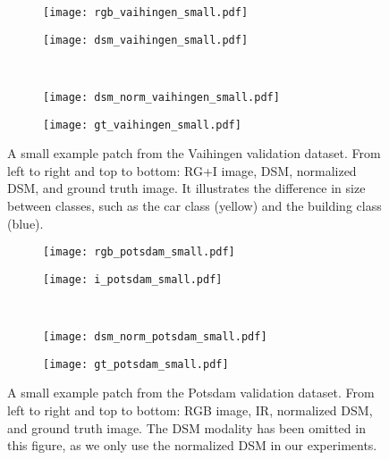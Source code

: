 \documentclass[journal]{IEEEtran}
\begin{document}
\begin{figure*}[ht]
\begin{minipage}[t]{0.49\textwidth}
    \centering
    \begin{subfigure}[b]{0.48\textwidth}
        \centering
        \texttt{[image: rgb\_vaihingen\_small.pdf]}
    \end{subfigure}
    \begin{subfigure}[b]{0.48\textwidth}
        \centering
        \texttt{[image: dsm\_vaihingen\_small.pdf]}
    \end{subfigure}\\
    \begin{subfigure}[b]{0.48\textwidth}
        \centering
        \texttt{[image: dsm\_norm\_vaihingen\_small.pdf]}
    \end{subfigure}
    \begin{subfigure}[b]{0.48\textwidth}
        \centering
        \texttt{[image: gt\_vaihingen\_small.pdf]}
    \end{subfigure}
    \caption{A small example patch from the Vaihingen validation dataset. From left to right and top to bottom: RG+I image, DSM, normalized DSM, and ground truth image. It illustrates the difference in size between classes, such as the car class (yellow) and the building class (blue).}
    \label{fig:exampleData}
\end{minipage}\hspace{0.2cm}
\begin{minipage}[t]{0.49\textwidth}
    \centering
    \begin{subfigure}[b]{0.48\textwidth}
        \centering
        \texttt{[image: rgb\_potsdam\_small.pdf]}
    \end{subfigure}
    \begin{subfigure}[b]{0.48\textwidth}
        \centering
        \texttt{[image: i\_potsdam\_small.pdf]}
    \end{subfigure}\\
    \begin{subfigure}[b]{0.48\textwidth}
        \centering
        \texttt{[image: dsm\_norm\_potsdam\_small.pdf]}
    \end{subfigure}
    \begin{subfigure}[b]{0.48\textwidth}
        \centering
        \texttt{[image: gt\_potsdam\_small.pdf]}
    \end{subfigure}
    \caption{A small example patch from the Potsdam validation dataset. From left to right and top to bottom: RGB image, IR, normalized DSM, and ground truth image. The DSM modality has been omitted in this figure, as we only use the normalized DSM in our experiments.}
    \label{fig:exampleDatab}
\end{minipage}
\end{figure*}
\end{document}
